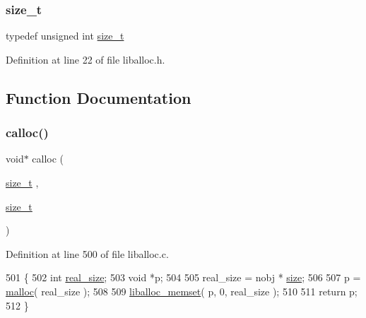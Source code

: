 \subsubsection{\texorpdfstring{size\+\_\+t}{size\_t}}
{\footnotesize\ttfamily typedef unsigned int \hyperlink{a00026_a7c94ea6f8948649f8d181ae55911eeaf_a7c94ea6f8948649f8d181ae55911eeaf}{size\+\_\+t}}



Definition at line 22 of file liballoc.\+h.



\subsection{Function Documentation}
\mbox{\label{a00026_a77e880b1033d5a912be4333fc5d31eef_a77e880b1033d5a912be4333fc5d31eef}} 
\subsubsection{\texorpdfstring{calloc()}{calloc()}}
{\footnotesize\ttfamily void$\ast$ calloc (\begin{DoxyParamCaption}\item[{\hyperlink{a00026_a7c94ea6f8948649f8d181ae55911eeaf_a7c94ea6f8948649f8d181ae55911eeaf}{size\+\_\+t}}]{,  }\item[{\hyperlink{a00026_a7c94ea6f8948649f8d181ae55911eeaf_a7c94ea6f8948649f8d181ae55911eeaf}{size\+\_\+t}}]{ }\end{DoxyParamCaption})}



Definition at line 500 of file liballoc.\+c.


\begin{DoxyCode}
501 \{
502        \textcolor{keywordtype}{int} \hyperlink{a00095_ad22b1c69bdce419783ac165f7f354245_ad22b1c69bdce419783ac165f7f354245}{real\_size};
503        \textcolor{keywordtype}{void} *p;
504 
505        real\_size = nobj * \hyperlink{a00095_a29b056a39f6022d32468e7913e6df936_a29b056a39f6022d32468e7913e6df936}{size};
506        
507        p = \hyperlink{a00023_a7ac38fce3243a7dcf448301ee9ffd392_a7ac38fce3243a7dcf448301ee9ffd392}{malloc}( real\_size );
508 
509        \hyperlink{a00023_ad824e94da51543e1febb05f96f0083ba_ad824e94da51543e1febb05f96f0083ba}{liballoc\_memset}( p, 0, real\_size );
510 
511        \textcolor{keywordflow}{return} p;
512 \}
\end{DoxyCode}
\mbox{\label{a00026_af07d89f5ceaea0c7c8252cc41fd75f37_af07d89f5ceaea0c7c8252cc41fd75f37}} 
